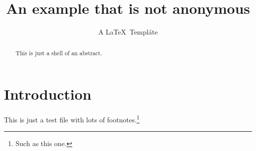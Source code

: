 \documentclass[journal=tches,version=submission,notanonymous]{iacrj}
\title[running  = {The iacrcc class},
      ]{An example that is not anonymous}
\subtitle[plaintext={A LaTeX Templ\r{a}te}]{A \LaTeX\ Templ\'ate}
\begin{document}
\maketitle


\begin{abstract}
This is just a shell of an abstract.
\end{abstract}

\section{Introduction}
This is just a test file with lots of footnotes.\footnote{Such as this one.}
\end{document}
